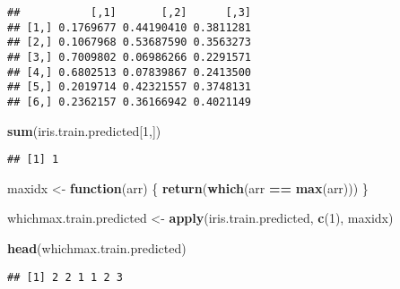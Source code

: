 \documentclass[
]{book}
\newenvironment{Shaded}{\begin{snugshade}}{\end{snugshade}}
\newcommand{\ControlFlowTok}[1]{\textcolor[rgb]{0.13,0.29,0.53}{\textbf{#1}}}
\newcommand{\DecValTok}[1]{\textcolor[rgb]{0.00,0.00,0.81}{#1}}
\newcommand{\KeywordTok}[1]{\textcolor[rgb]{0.13,0.29,0.53}{\textbf{#1}}}
\newcommand{\NormalTok}[1]{#1}
\newcommand{\OperatorTok}[1]{\textcolor[rgb]{0.81,0.36,0.00}{\textbf{#1}}}
\newcommand{\StringTok}[1]{\textcolor[rgb]{0.31,0.60,0.02}{#1}}
\begin{document}
\begin{Shaded}
\end{Shaded}

\begin{verbatim}
##           [,1]       [,2]      [,3]
## [1,] 0.1769677 0.44190410 0.3811281
## [2,] 0.1067968 0.53687590 0.3563273
## [3,] 0.7009802 0.06986266 0.2291571
## [4,] 0.6802513 0.07839867 0.2413500
## [5,] 0.2019714 0.42321557 0.3748131
## [6,] 0.2362157 0.36166942 0.4021149
\end{verbatim}

\begin{Shaded}
\begin{Highlighting}[]
\KeywordTok{sum}\NormalTok{(iris.train.predicted[}\DecValTok{1}\NormalTok{,])}
\end{Highlighting}
\end{Shaded}

\begin{verbatim}
## [1] 1
\end{verbatim}

\begin{Shaded}
\begin{Highlighting}[]
\NormalTok{maxidx <-}\StringTok{ }\ControlFlowTok{function}\NormalTok{(arr) \{}
  \KeywordTok{return}\NormalTok{(}\KeywordTok{which}\NormalTok{(arr }\OperatorTok{==}\StringTok{ }\KeywordTok{max}\NormalTok{(arr)))}
\NormalTok{\}}

\NormalTok{whichmax.train.predicted <-}\StringTok{ }\KeywordTok{apply}\NormalTok{(iris.train.predicted, }\KeywordTok{c}\NormalTok{(}\DecValTok{1}\NormalTok{), maxidx)}

\KeywordTok{head}\NormalTok{(whichmax.train.predicted)}
\end{Highlighting}
\end{Shaded}

\begin{verbatim}
## [1] 2 2 1 1 2 3
\end{verbatim}

\begin{Shaded}
\end{Shaded}
\end{document}
